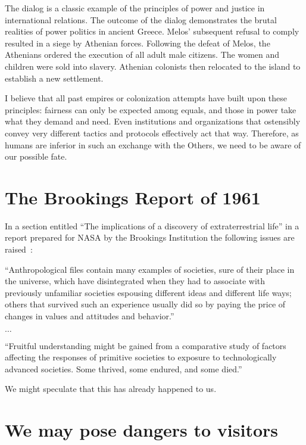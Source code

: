 The dialog is a classic example of the principles of power and justice in international relations. The outcome of the dialog demonstrates the brutal realities of power politics in ancient Greece. Melos' subsequent refusal to comply resulted in a siege by Athenian forces. Following the defeat of Melos, the Athenians ordered the execution of all adult male citizens. The women and children were sold into slavery. Athenian colonists then relocated to the island to establish a new settlement.

I believe that all past empires or colonization attempts have built upon these principles: fairness can only be expected among equals, and those in power take what they demand and need. Even institutions and organizations that ostensibly convey very different tactics and protocols effectively act that way. Therefore, as humans are inferior in such an exchange with the Others, we need to be aware of our possible fate.

\section{The Brookings Report of 1961}

In a section entitled ``The implications of a discovery of extraterrestrial life''
in a report prepared for NASA by the Brookings Institution
the following issues are raised~\cite[p.~215 and Footnote~37, p.~226]{MichaelDonald1961}:
\begin{svgraybox}
``Anthropological files contain many examples of societies, sure of their place in the universe,
which have disintegrated when they had to associate with previously unfamiliar societies
espousing different ideas and different life ways; others that survived such an experience usually did so
by paying the price of changes in values and attitudes and behavior.''

$\ldots$

``Fruitful understanding might be gained from a comparative
study of factors affecting the responses of primitive societies to exposure to
technologically advanced societies. Some thrived, some endured, and some died.''
\end{svgraybox}

We might speculate that this has already happened to us.

\section{We may pose dangers to visitors}


